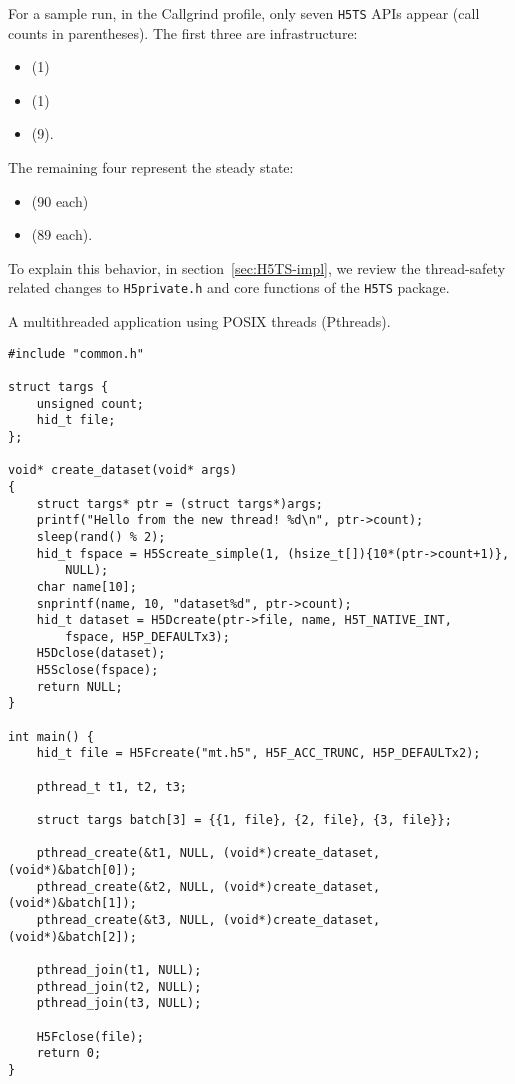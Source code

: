 For a sample run, in the Callgrind profile, only seven \texttt{H5TS} APIs appear (call counts in parentheses). The first three are infrastructure:
\begin{itemize}
    \item {} (1)
    \item {} (1)
    \item {} (9).
\end{itemize}
The remaining four represent the steady state:
\begin{itemize}
    \item {} (90 each)
    \item {} (89 each).
\end{itemize}

To explain this behavior, in section~\ref{sec:H5TS-impl}, we review the thread-safety related changes to \texttt{H5private.h} and core functions of the \texttt{H5TS} package.

\begin{listing}
\centering
\caption{A multithreaded application using POSIX threads (Pthreads).}
\label{lst:pthreads-ex-parallel}
\begin{verbatim}
#include "common.h"

struct targs {
    unsigned count;
    hid_t file;
};

void* create_dataset(void* args)
{
    struct targs* ptr = (struct targs*)args;
    printf("Hello from the new thread! %d\n", ptr->count);
    sleep(rand() % 2);
    hid_t fspace = H5Screate_simple(1, (hsize_t[]){10*(ptr->count+1)},
        NULL);
    char name[10];
    snprintf(name, 10, "dataset%d", ptr->count);
    hid_t dataset = H5Dcreate(ptr->file, name, H5T_NATIVE_INT,
        fspace, H5P_DEFAULTx3);
    H5Dclose(dataset);
    H5Sclose(fspace);
    return NULL;
}

int main() {
    hid_t file = H5Fcreate("mt.h5", H5F_ACC_TRUNC, H5P_DEFAULTx2);

    pthread_t t1, t2, t3;

    struct targs batch[3] = {{1, file}, {2, file}, {3, file}};

    pthread_create(&t1, NULL, (void*)create_dataset, (void*)&batch[0]);
    pthread_create(&t2, NULL, (void*)create_dataset, (void*)&batch[1]);
    pthread_create(&t3, NULL, (void*)create_dataset, (void*)&batch[2]);

    pthread_join(t1, NULL);
    pthread_join(t2, NULL);
    pthread_join(t3, NULL);

    H5Fclose(file);
    return 0;
}
\end{verbatim}
\end{listing}

